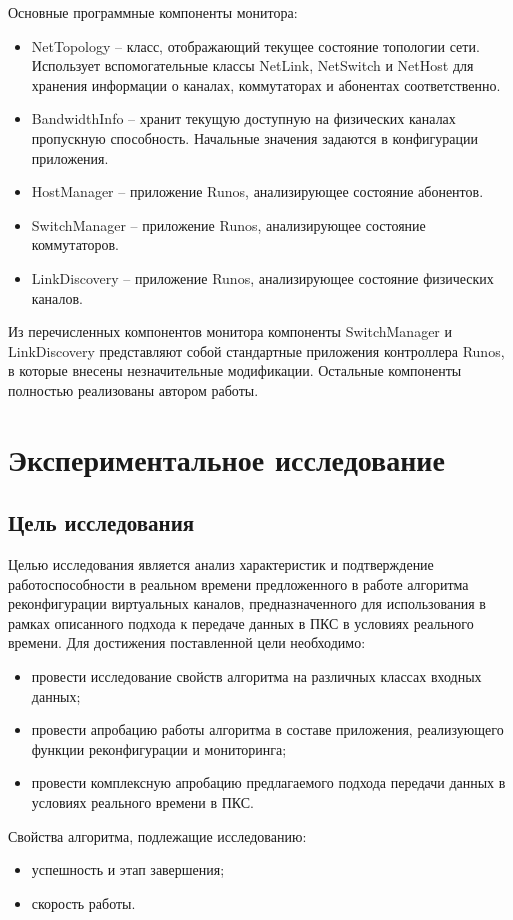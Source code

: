 \documentclass[12pt, a4paper]{article}
\begin{document}
Основные программные компоненты монитора:
\begin{itemize}
	\item NetTopology -- класс, отображающий текущее состояние топологии сети. Использует вспомогательные классы NetLink, NetSwitch и NetHost для хранения информации о каналах, коммутаторах и абонентах соответственно.
	\item BandwidthInfo -- хранит текущую доступную на физических каналах пропускную способность. Начальные значения задаются в конфигурации приложения.
	\item HostManager -- приложение Runos, анализирующее состояние абонентов.
	\item SwitchManager -- приложение Runos, анализирующее состояние коммутаторов.
	\item LinkDiscovery -- приложение Runos, анализирующее состояние физических каналов.
\end{itemize}

Из перечисленных компонентов монитора компоненты SwitchManager и LinkDiscovery представляют собой стандартные приложения контроллера Runos, в которые внесены незначительные модификации. Остальные компоненты полностью реализованы автором работы. 

\section{Экспериментальное исследование}
\subsection{Цель исследования}
Целью исследования является анализ характеристик и подтверждение работоспособности в реальном времени предложенного в работе алгоритма реконфигурации виртуальных каналов, предназначенного для использования в рамках описанного подхода к передаче данных в ПКС в условиях реального времени. Для достижения поставленной цели необходимо:
\begin{itemize}
	\item провести исследование свойств алгоритма на различных классах входных данных; 
	\item провести апробацию работы алгоритма в составе приложения, реализующего функции реконфигурации и мониторинга;
	\item провести комплексную апробацию предлагаемого подхода передачи данных в условиях реального времени в ПКС.
\end{itemize}

Свойства алгоритма, подлежащие исследованию:
\begin{itemize}
	\item успешность и этап завершения;
	\item скорость работы.
\end{itemize}
\end{document}
